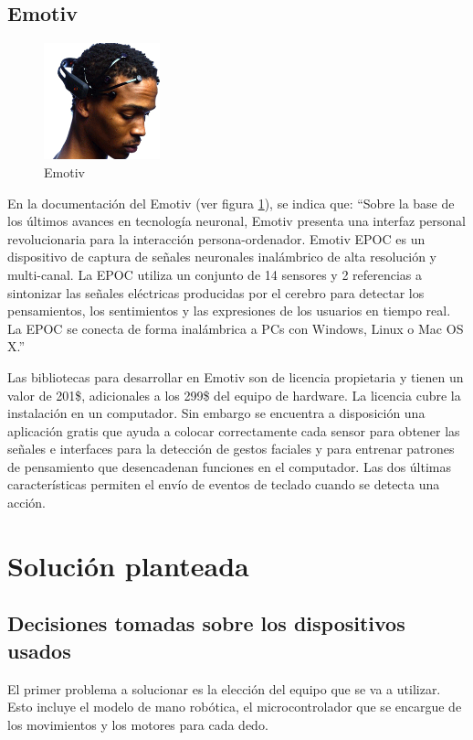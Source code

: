 \documentclass[letterpaper,journal,transmag]{IEEEtran}
\begin{document}
\subsection{Emotiv}
\label{subsec:emotiv}
      \begin{figure}[ht]
         \includegraphics[width=0.3\textwidth]{emotiv}
         \caption{Emotiv}
         \label{fig:emotiv}
      \end{figure}
En la documentación del Emotiv \cite{_epoc_????} (ver figura \ref{fig:emotiv}),
se indica que: ``Sobre la base de los últimos avances en tecnología neuronal,
Emotiv presenta una interfaz personal revolucionaria para la interacción 
persona-ordenador. Emotiv EPOC es un dispositivo de captura de señales
neuronales inalámbrico de alta resolución y multi-canal. La EPOC utiliza un
conjunto de 14 sensores y 2 referencias a sintonizar las señales eléctricas
producidas por el cerebro para detectar los pensamientos, los sentimientos y las
expresiones de los usuarios en tiempo real. La EPOC se conecta de forma
inalámbrica a PCs con Windows, Linux o Mac OS X.''

Las bibliotecas para desarrollar en Emotiv son de licencia propietaria y tienen
un valor de 201\$, adicionales a los 299\$ del equipo de hardware. La licencia
cubre la instalación en un computador. Sin embargo se encuentra a disposición
una aplicación gratis que ayuda a colocar correctamente cada sensor para
obtener las señales e interfaces para la detección de gestos faciales y para
entrenar patrones de pensamiento que desencadenan funciones en el computador.
Las dos últimas características permiten el envío de eventos de teclado cuando
se detecta una acción.

\section{Solución planteada}
\subsection{Decisiones tomadas sobre los dispositivos usados}
\label{subsec:decisiones}
El primer problema a solucionar es la elección del equipo que se va a utilizar.
Esto incluye el modelo de mano robótica, el microcontrolador que se encargue de
los movimientos y los motores para cada dedo.
\end{document}
